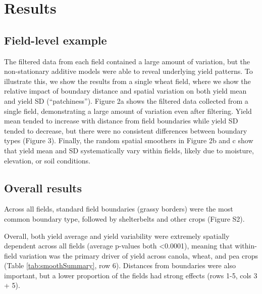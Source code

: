 \documentclass[]{elsarticle} %
\begin{document}
\hypertarget{results}{%
\section{Results}\label{results}}

\hypertarget{field-level-example}{%
\subsection{Field-level example}\label{field-level-example}}

The filtered data from each field contained a large amount of variation, but the non-stationary additive models were able to reveal underlying yield patterns.
To illustrate this, we show the results from a single wheat field, where we show the relative impact of boundary distance and spatial variation on both yield mean and yield SD (``patchiness'').
Figure 2a shows the filtered data collected from a single field, demonstrating a large amount of variation even after filtering.
Yield mean tended to increase with distance from field boundaries while yield SD tended to decrease, but there were no consistent differences between boundary types (Figure 3).
Finally, the random spatial smoothers in Figure 2b and c show that yield mean and SD systematically vary within fields, likely due to moisture, elevation, or soil conditions.

\hypertarget{overall-results}{%
\subsection{Overall results}\label{overall-results}}

Across all fields, standard field boundaries (grassy borders) were the most common boundary type, followed by shelterbelts and other crops (Figure S2).

Overall, both yield average and yield variability were extremely spatially dependent across all fields (average p-values both \textless0.0001), meaning that within-field variation was the primary driver of yield across canola, wheat, and pea crops (Table \ref{tab:smoothSummary}, row 6).
Distances from boundaries were also important, but a lower proportion of the fields had strong effects (rows 1-5, cols 3 + 5).
\end{document}

